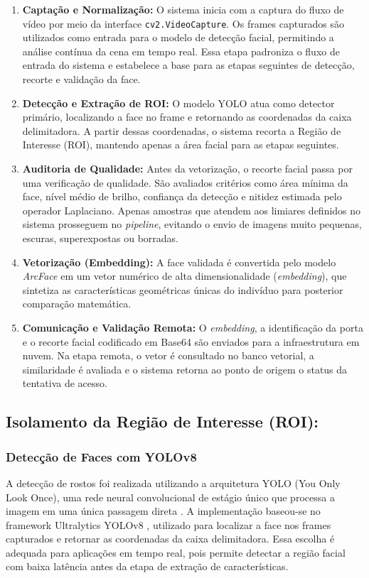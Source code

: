 \begin{enumerate}
    \item \textbf{Captação e Normalização:} O sistema inicia com a captura do fluxo de vídeo por meio da interface \texttt{cv2.VideoCapture}. Os frames capturados são utilizados como entrada para o modelo de detecção facial, permitindo a análise contínua da cena em tempo real. Essa etapa padroniza o fluxo de entrada do sistema e estabelece a base para as etapas seguintes de detecção, recorte e validação da face.

    \item \textbf{Detecção e Extração de ROI:} O modelo YOLO atua como detector primário, localizando a face no frame e retornando as coordenadas da caixa delimitadora. A partir dessas coordenadas, o sistema recorta a Região de Interesse (ROI), mantendo apenas a área facial para as etapas seguintes.

    \item \textbf{Auditoria de Qualidade:} Antes da vetorização, o recorte facial passa por uma verificação de qualidade. São avaliados critérios como área mínima da face, nível médio de brilho, confiança da detecção e nitidez estimada pelo operador Laplaciano. Apenas amostras que atendem aos limiares definidos no sistema prosseguem no \textit{pipeline}, evitando o envio de imagens muito pequenas, escuras, superexpostas ou borradas.
    
    \item \textbf{Vetorização (Embedding):} A face validada é convertida pelo modelo \textit{ArcFace} em um vetor numérico de alta dimensionalidade (\textit{embedding}), que sintetiza as características geométricas únicas do indivíduo para posterior comparação matemática.

    \item \textbf{Comunicação e Validação Remota:} O \textit{embedding}, a identificação da porta e o recorte facial codificado em Base64 são enviados para a infraestrutura em nuvem. Na etapa remota, o vetor é consultado no banco vetorial, a similaridade é avaliada e o sistema retorna ao ponto de origem o status da tentativa de acesso.
\end{enumerate}

\subsection{Isolamento da Região de Interesse (ROI):}

\subsubsection{Detecção de Faces com YOLOv8}
A detecção de rostos foi realizada utilizando a arquitetura YOLO (You Only Look Once), uma rede neural convolucional de estágio único que processa a imagem em uma única passagem direta \cite{redmon2016you}. A implementação baseou-se no framework Ultralytics YOLOv8 \cite{yolov8_ultralytics}, utilizado para localizar a face nos frames capturados e retornar as coordenadas da caixa delimitadora. Essa escolha é adequada para aplicações em tempo real, pois permite detectar a região facial com baixa latência antes da etapa de extração de características.

